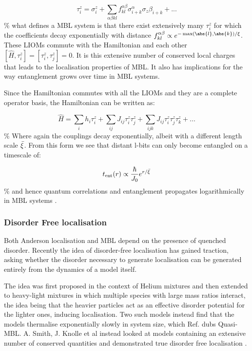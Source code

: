 \[ \tau^z_i = \sigma^z_i + \sum_{\alpha\beta kl} f_{kl}^{\alpha\beta} \sigma^\alpha_{i+k} \sigma_z\beta_{i+k} + ...\] \% what defines a MBL system is that there exist extensively many \(\tau^z_i\) for which the coefficients decay exponentially with distance \(f_{kl}^{\alpha\beta} \propto e^{-\max(\abs{l},\abs{k}) / \xi}\). These LIOMs commute with the Hamiltonian and each other \([\hat{H}, \tau^z_i] = [\tau^z_i, \tau^z_j] = 0\). It is this extensive number of conserved local charges that leads to the localisation properties of MBL. It also has implications for the way entanglement grows over time in MBL systems.

Since the Hamiltonian commutes with all the LIOMs and they are a complete operator basis, the Hamiltonian can be written as:

\[\hat{H} = \sum_{i} h_i \tau^z_i + \sum_{ij} J_{ij} \tau^z_i \tau^z_j + \sum_{ijk} J_{ij} \tau^z_i \tau^z_j \tau^z_k+ ...\] \% Where again the couplings decay exponentially, albeit with a different length scale \(\Bar{\xi}\). From this form we see that distant l-bits can only become entangled on a timescale of:

\[ t_{\mathrm{ent}}(r) \propto \frac{\hbar}{J_0} e^{r/\Bar{\xi}} \] \% and hence quantum correlations and entanglement propagates logarithmically in MBL systems \textcite{imbrieDiagonalizationManyBodyLocalization2016}.

\hypertarget{disorder-free-localisation}{%
\subsubsection{Disorder Free localisation}\label{disorder-free-localisation}}

Both Anderson localisation and MBL depend on the presence of quenched disorder. Recently the idea of disorder-free localisation has gained traction, asking whether the disorder necessary to generate localisation can be generated entirely from the dynamics of a model itself.

The idea was first proposed in the context of Helium mixtures \autocite{kagan1984localization} and then extended to heavy-light mixtures in which multiple species with large mass ratios interact, the idea being that the heavier particles act as an effective disorder potential for the lighter ones, inducing localisation. Two such models \autocite{yaoQuasiManyBodyLocalizationTranslationInvariant2016,schiulazDynamicsManybodyLocalized2015} instead find that the models thermalise exponentially slowly in system size, which Ref. \autocite{yaoQuasiManyBodyLocalizationTranslationInvariant2016} dubs Quasi-MBL. A. Smith, J. Knolle et al instead looked at models containing an extensive number of conserved quantities and demonstrated true disorder free localisation \autocite{smithDisorderFreeLocalization2017}.

